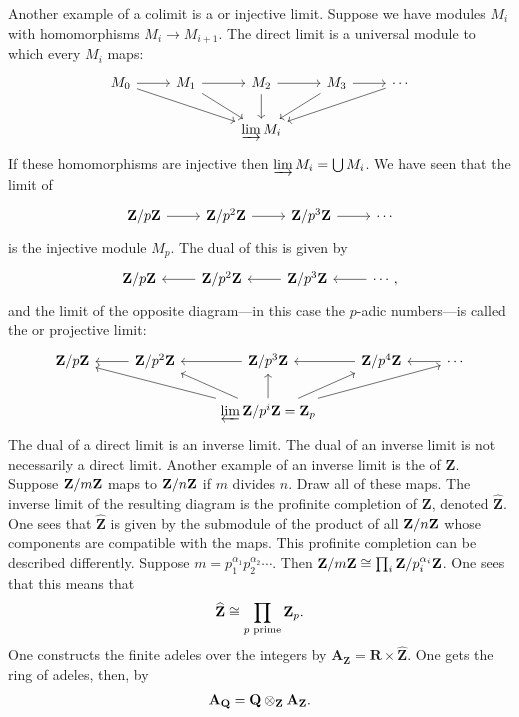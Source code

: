 \documentclass[11pt, oneside,margin=1in]{article}
\begin{document}
Another example of a colimit is a  or injective limit. Suppose we have modules $M_i$ with homomorphisms $M_i\longrightarrow M_{i+1}$. The direct limit is a universal module to which every $M_i$ maps:
\[
\begin{tikzcd}
	M_0 \arrow[r] \arrow[rrd] & M_1 \arrow[r] \arrow[rd] & M_2 \arrow[r] \arrow[d] & M_3 \arrow[r] \arrow[ld] & \cdots \arrow[lld]\\
				  && \varinjlim M_i
\end{tikzcd}
\]
If these homomorphisms are injective then $\varinjlim M_i = \bigcup M_i$. We have seen that the limit of 
 \[
\begin{tikzcd}
	\Zmod p \arrow[r] & \Zmod {p^2} \arrow[r] & \Zmod {p^3} \arrow[r] & \cdots
\end{tikzcd}
\]
is the injective module $M_p$. The dual of this is given by
\[
\begin{tikzcd}
	\Zmod p  & \Zmod {p^2} \arrow[l] & \Zmod {p^3} \arrow[l] & \cdots, \arrow[l]
\end{tikzcd}
\]
and the limit of the opposite diagram---in this case the $p$-adic numbers---is called the  or projective limit:
\[
\begin{tikzcd}
	\Zmod p  & \Zmod {p^2} \arrow[l] & \Zmod {p^3} \arrow[l] &\Zmod{p^4} \arrow[l] & \cdots \arrow[l] \\
	 && \varprojlim \Zmod {p^i} = \Z_p \arrow[lu] \arrow[u] \arrow[llu] \arrow[ru] \arrow[rru]
\end{tikzcd}
\]
The dual of a direct limit is an inverse limit. The dual of an inverse limit is not necessarily a direct limit. Another example of an inverse limit is the  of $\mathbf{Z}$. Suppose $\mathbf Z / m\mathbf Z$ maps to $\mathbf Z / n\mathbf Z$ if $m$ divides $n$. Draw all of these maps. The inverse limit of the resulting diagram is the profinite completion of $\mathbf{Z}$, denoted $\widehat{\mathbf{Z}}$. One sees that $\widehat{\mathbf{Z}}$ is given by the submodule of the product of all $\mathbf Z / n\mathbf Z$ whose components are compatible with the maps. This profinite completion can be described differently. Suppose $m = p_1^{\alpha_1}p_2^{\alpha_2} \cdots$. Then $\mathbf Z / m\mathbf Z \cong \prod_i \mathbf Z / p_i^{\alpha_i}\mathbf Z$. One sees that this means that
\begin{align*}
	\widehat{\mathbf{Z}} \cong \prod_{p \textrm{ prime}} \mathbf Z_p.
\end{align*}
One constructs the finite adeles over the integers by $\mathbf{A}_{\mathbf{Z}}=\mathbf{R}\times \widehat{\mathbf{Z}}$. One gets the ring of adeles, then, by 
\begin{align*}
	\mathbf{A}_{\mathbf{Q}} = \mathbf{Q}\otimes_{\mathbf{Z}} \mathbf{A}_{\mathbf{Z}}.
\end{align*}
\end{document}
